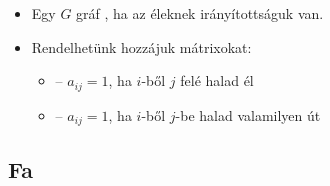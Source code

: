\documentclass[../../main.tex]{subfiles}
\begin{document}
\begin{itemize}
	\item Egy $G$ gráf , ha az éleknek irányítottságuk van.

	\item Rendelhetünk hozzájuk mátrixokat:
	      \begin{itemize}
		      \item {} – $a_{ij} = 1$,
		            ha $i$-ből $j$ felé halad él

		      \item {} – $a_{ij} = 1$,
		            ha $i$-ből $j$-be halad valamilyen út
	      \end{itemize}
\end{itemize}

\subsection{Fa}
\end{document}
